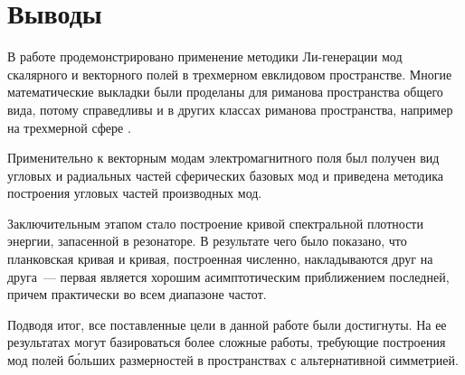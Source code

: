 %
%
%
%
%
%

\section{Выводы}

    В работе продемонстрировано применение методики Ли-генерации мод скалярного и векторного полей в трехмерном евклидовом пространстве. Многие математические выкладки были проделаны для риманова пространства общего вида, потому справедливы и в других классах риманова пространства, например на трехмерной сфере \cite{burlankov_tmf}.

    Применительно к векторным модам электромагнитного поля был получен вид угловых и радиальных частей сферических базовых мод и приведена методика построения угловых частей производных мод.

    Заключительным этапом стало построение кривой спектральной плотности энергии, запасенной в резонаторе. В результате чего было показано, что планковская кривая и кривая, построенная численно, накладываются друг на друга~--- первая является хорошим асимптотическим приближением последней, причем практически во всем диапазоне частот.

    Подводя итог, все поставленные цели в данной работе были достигнуты. На ее результатах могут базироваться более сложные работы, требующие построения мод полей б\'{о}льших размерностей в пространствах с альтернативной симметрией.
